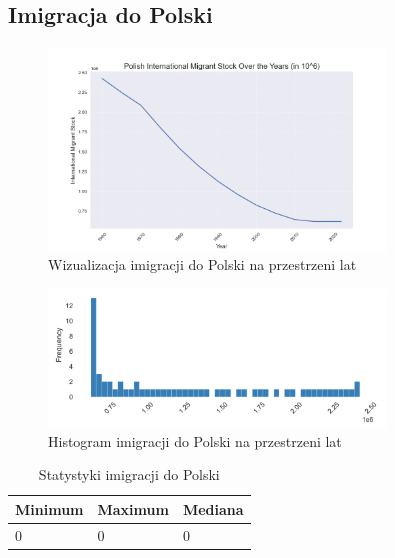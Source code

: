 \documentclass[11pt]{article}
\begin{document}
\subsection*{Imigracja do Polski}
\begin{figure}[H]
        \centering
        \includegraphics[width=0.8\textwidth]{polish_int_migrant_stock_over_the_years.png}
        \caption{Wizualizacja imigracji do Polski na przestrzeni lat}
\end{figure}
\begin{figure}[H]
        \centering
        \includegraphics[width=0.8\textwidth]{images/histogram_imigracja.png}
        \caption{Histogram imigracji do Polski na przestrzeni lat}
\end{figure}
\begin{table}[H]
        \centering
        \begin{tabular}{|l|l|l|}
        \hline
        Minimum & Maximum & Mediana \\ \hline
        0 & 0 & 0 \\ \hline
        \end{tabular}
        \caption{Statystyki imigracji do Polski}
        \end{table}
\end{document}
